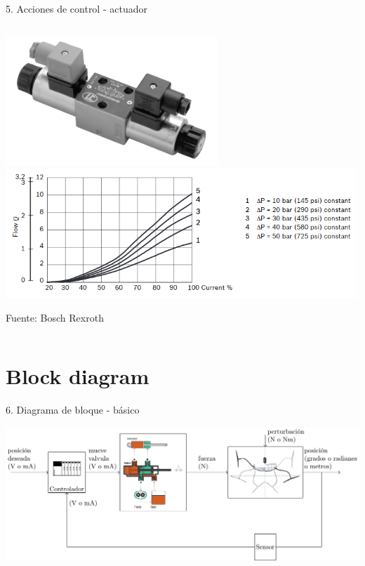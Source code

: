 \documentclass[presentation,aspectratio=169]{beamer}
\begin{document}
\begin{frame}[label={sec:orgcf65506}]{5. Acciones de control - actuador}
\begin{columns}
\begin{column}{0.5\columnwidth}
\begin{center}
\includegraphics[width=0.6\textwidth]{../../figures/43-valve-real.png}\\
\includegraphics[width=0.99\textwidth]{../../figures/43-valve-current.png}\\
\end{center}
{\footnotesize Fuente: Bosch Rexroth}
\end{column}
\end{columns}
\end{frame}

\section{Block diagram}
\label{sec:org4bbe226}


\begin{frame}[label={sec:org95335cb}]{6. Diagrama de bloque - básico}
\begin{center}
\includegraphics[width=1.0\textwidth]{../../figures/ac75-control-block-feedback-units}
\end{center}
\end{frame}
\end{document}
